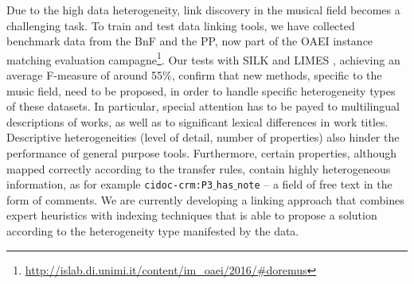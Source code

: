 \documentclass[runningheads,a4paper]{llncs}
\begin{document}
Due to the high data heterogeneity, link discovery in the musical field becomes a challenging task. To train and test data linking tools, we have collected benchmark data from the BnF and the PP, now part of the OAEI instance matching evaluation campagne\footnote{\url{http://islab.di.unimi.it/content/im_oaei/2016/#doremus}}. Our tests with  SILK \cite{jentzsch2010silk} and LIMES \cite{ngomo2011limes}, achieving an average F-measure of around 55\%, confirm that new methods, specific to the music field, need to be proposed, in order to handle specific heterogeneity types of these datasets. In particular, special attention has to be payed to multilingual descriptions of works, as well as to significant lexical differences in work titles. Descriptive heterogeneities (level of detail, number of properties) also hinder the performance of general purpose tools. Furthermore, certain properties, although mapped correctly according to the transfer rules, contain highly heterogeneous information, as for example \texttt{cidoc-crm:P3$\_$has$\_$note} -- a field of free text in the form of comments. We are currently developing a linking approach that combines expert heuristics with indexing techniques that is able to propose a solution according to the heterogeneity type manifested by the data.














\end{document}
